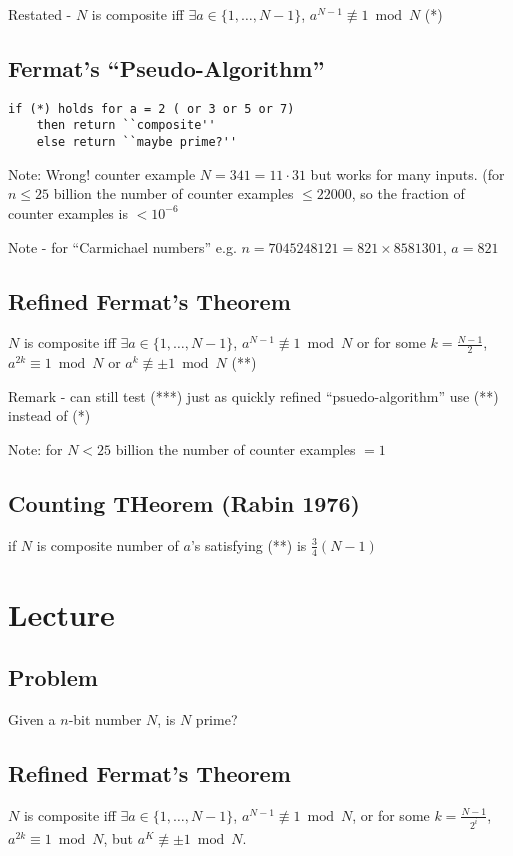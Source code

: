 \documentclass[english,12pt]{article}
\theoremstyle{plain}
\theoremstyle{definition}
\theoremstyle{definition} %
\begin{document}
Restated - $N$ is composite iff $\exists a\in\{1,\ldots, N-1\}$, $a^{N-1}\not\equiv 1\bmod N$ (*)

\subsection{Fermat's ``Pseudo-Algorithm''}
\begin{verbatim}
if (*) holds for a = 2 ( or 3 or 5 or 7)
    then return ``composite''
    else return ``maybe prime?''
\end{verbatim}

Note: Wrong! counter example $N=341=11\cdot 31$ but works for many inputs.  (for $n\le 25$ billion the number of counter examples $\le 22000$, so the fraction of counter examples is $<10^{-6}$

Note - for ``Carmichael numbers''
e.g. $n=7045248121 = 821\times 8581301$, $a=821$

\subsection{Refined Fermat's Theorem}
$N$ is composite iff $\exists a\in\{1,\ldots, N-1\}$, $a^{N-1}\not\equiv 1\bmod N$ or for some $k=\frac{N-1}{2}$, $a^{2k}\equiv 1\bmod N$ or $a^k\not\equiv \pm 1\bmod N$ (**)

Remark - can still test (***) just as quickly refined ``psuedo-algorithm'' use (**) instead of (*)

Note: for $N<25$ billion the number of counter examples $=1$

\subsection{Counting THeorem (Rabin 1976)}
if $N$ is composite number of $a$'s satisfying (**) is $\frac{3}{4}(N-1)$


\section{Lecture}
\subsection{Problem}
Given a $n$-bit number $N$, is $N$ prime?

\subsection{Refined Fermat's Theorem}
$N$ is composite iff $\exists a\in \{1,\ldots, N-1\}$, $a^{N-1}\not\equiv 1\bmod N$, or for some $k=\frac{N-1}{2^i}$, $a^{2k}\equiv 1\bmod N$, but $a^K\not\equiv \pm 1 \bmod N$.
\end{document}

